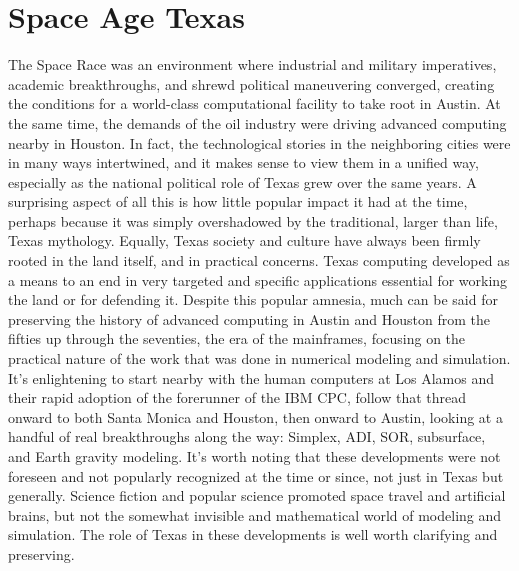 \chapter{Space Age Texas}

The Space Race was an environment where industrial and military imperatives, academic breakthroughs, and shrewd political maneuvering converged, creating the conditions for a world-class computational facility to take root in Austin. At the same time, the demands of the oil industry were driving advanced computing nearby in Houston. In fact, the technological stories in the neighboring cities were in many ways intertwined, and it makes sense to view them in a unified way, especially as the national political role of Texas grew over the same years. A surprising aspect of all this is how little popular impact it had at the time, perhaps because it was simply overshadowed by the traditional, larger than life, Texas mythology. Equally, Texas society and culture have always been firmly rooted in the land itself, and in practical concerns. Texas computing developed as a means to an end in very targeted and specific applications essential for working the land or for defending it. Despite this popular amnesia, much can be said for preserving the history of advanced computing in Austin and Houston from the fifties up through the seventies, the era of the mainframes, focusing on the practical nature of the work that was done in numerical modeling and simulation. It’s enlightening to start nearby with the human computers at Los Alamos and their rapid adoption of the forerunner of the IBM CPC, follow that thread onward to both Santa Monica and Houston, then onward to Austin, looking at a handful of real breakthroughs along the way: Simplex, ADI, SOR, subsurface, and Earth gravity modeling. It’s worth noting that these developments were not foreseen and not popularly recognized at the time or since, not just in Texas but generally. Science fiction and popular science promoted space travel and artificial brains, but not the somewhat invisible and mathematical world of modeling and simulation. The role of Texas in these developments is well worth clarifying and preserving.

